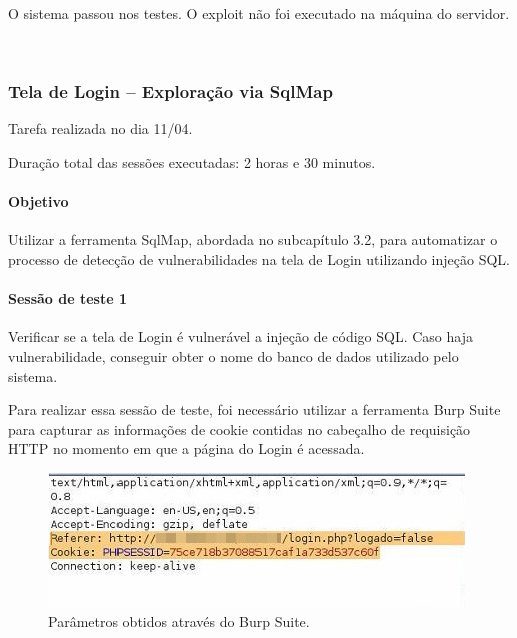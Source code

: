 \documentclass[
    12pt,               %
    openright,          %
    oneside,            %
    a4paper,            %
    section=TITLE,     %
    english,            %
    french,             %
    spanish,            %
    brazil              %
    ]{abntex2}
\begin{document}
O sistema passou nos testes. O exploit não foi executado na máquina do servidor.


~





\subsubsection*{Tela de Login -- Exploração via SqlMap}

Tarefa realizada no dia 11/04.


Duração total das sessões executadas: 2 horas e 30 minutos.



\paragraph*{Objetivo}

Utilizar a ferramenta SqlMap, abordada no subcapítulo 3.2, para automatizar o processo de detecção de vulnerabilidades na tela de Login utilizando injeção SQL.



\paragraph*{Sessão de teste 1}

Verificar se a tela de Login é vulnerável a injeção de código SQL. Caso haja vulnerabilidade, conseguir obter o nome do banco de dados utilizado pelo sistema.


Para realizar essa sessão de teste, foi necessário utilizar a ferramenta Burp Suite para capturar as informações de cookie contidas no cabeçalho de requisição HTTP no momento em que a página do Login é acessada.





\begin{figure}[htp]
\centering
\caption{Parâmetros obtidos através do Burp Suite.}
\includegraphics[width=417px]{imagem11Editada.jpeg}
\end{figure}
\ifdefined\FloatBarrier \FloatBarrier \fi
\end{document}
